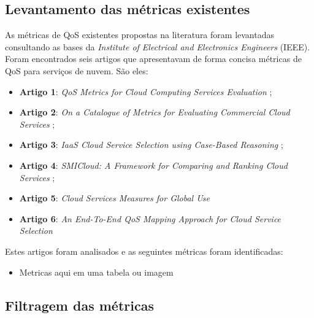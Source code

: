 \documentclass[conference]{IEEEtran}
\begin{document}
  \subsection{Levantamento das métricas existentes}
      
      As métricas de QoS existentes propostas na literatura foram levantadas consultando as bases da
      \textit{Institute of Electrical and Electronics Engineers} (IEEE). Foram encontrados seis artigos que apresentavam de forma concisa
      métricas de QoS para serviços de nuvem. São eles:
      
      \begin{itemize}
       \item \textbf{Artigo 1}: \textit{QoS Metrics for Cloud Computing Services Evaluation} \cite{bardsiri2014};
       \item \textbf{Artigo 2}: \textit{On a Catalogue of Metrics for Evaluating Commercial Cloud Services} \cite{li2012};
       \item \textbf{Artigo 3}: \textit{IaaS Cloud Service Selection using Case-Based Reasoning} \cite{soltani2016};
       \item \textbf{Artigo 4}: \textit{SMICloud: A Framework for Comparing and Ranking Cloud Services} \cite{garg2011};
       \item \textbf{Artigo 5}: \textit{Cloud Services Measures for Global Use} \cite{siegel2012cloud}
       \item \textbf{Artigo 6}: \textit{An End-To-End QoS Mapping Approach for Cloud Service Selection} \cite{karim2013}
      \end{itemize}
     
      
      Estes artigos foram analisados e as seguintes métricas foram identificadas:
      
     \begin{itemize}
      \item Metricas aqui em uma tabela ou imagem
     \end{itemize}
     
  \subsection{Filtragem das métricas}
  
\end{document}
